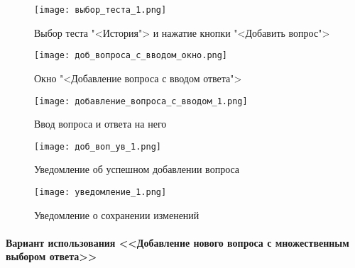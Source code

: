 \begin{figure}[H]
	\centering
	\texttt{[image: выбор\_теста\_1.png]}
	\caption{Выбор теста "<История"> и нажатие кнопки "<Добавить вопрос">}
	\label{select_test_1:image}
\end{figure}
\begin{figure}[H]
	\centering
	\texttt{[image: доб\_вопроса\_с\_вводом\_окно.png]}
	\caption{Окно "<Добавление вопроса с вводом ответа">}
	\label{adding_baseQuestion_window:image}
\end{figure}
\begin{figure}[H]
	\centering
	\texttt{[image: добавление\_вопроса\_с\_вводом\_1.png]}
	\caption{Ввод вопроса и ответа на него}
	\label{adding_baseQuestion_1:image}
\end{figure}
\begin{figure}[ht]
	\centering
	\texttt{[image: доб\_воп\_ув\_1.png]}
	\caption{Уведомление об успешном добавлении вопроса}
	\label{adding_baseQuestion_2:image}
\end{figure}
\begin{figure}[H]
	\centering
	\texttt{[image: уведомление\_1.png]}
	\caption{Уведомление о сохранении изменений}
	\label{adding_baseQuestion_3:image}
\end{figure}

\paragraph{Вариант использования <<Добавление нового вопроса с множественным выбором ответа>>}

